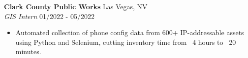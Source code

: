 
\textbf{Clark County Public Works} \hfill Las Vegas, NV \\
\textit{GIS Intern} \hfill 01/2022 - 05/2022
\begin{itemize}[leftmargin=*, nosep]
  \item Automated collection of phone config data from 600+ IP-addressable assets using Python and Selenium, cutting inventory time from ~4 hours to ~20 minutes.
\end{itemize}
